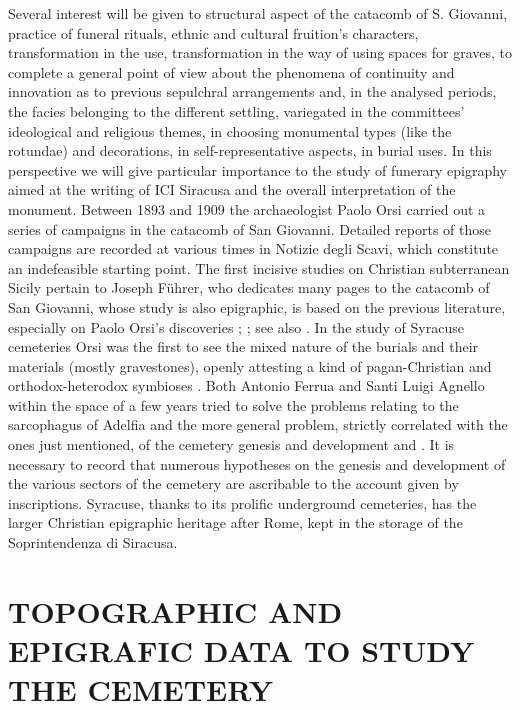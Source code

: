 \documentclass[amsthm,ebook]{saparticle}
\begin{document}
Several interest will be given to structural aspect of the catacomb of S. Giovanni, practice of funeral rituals, ethnic and cultural fruition’s characters, transformation in the use, transformation in the way of using spaces for graves, to complete a general point of view about the phenomena of continuity and innovation as to previous sepulchral arrangements and, in the analysed periods, the facies belonging to the different settling, variegated in the committees’ ideological and religious themes, in choosing monumental types (like the rotundae) and decorations, in self-representative aspects, in burial uses. In this perspective we will give particular importance to the study of funerary epigraphy aimed at the writing of ICI Siracusa and the overall interpretation of the monument.
Between 1893 and 1909 the archaeologist Paolo Orsi carried out a series of campaigns in the catacomb of San Giovanni. Detailed reports of those campaigns are recorded at various times in Notizie degli Scavi, which constitute an indefeasible starting point. The first incisive studies on Christian subterranean Sicily pertain to Joseph Führer, who dedicates many pages to the catacomb of San Giovanni, whose study is also epigraphic, is based on the previous literature, especially on Paolo Orsi’s discoveries \citep[13-39]{FUHRER1897}; \citep[22-26]{FUHRERSCHULTZE1907}; see also \citep[276, n. 2]{ORSI1893} 
. In the study of Syracuse cemeteries Orsi \citep[189]{ORSI1900} was the first to see the mixed nature of the burials and their materials (mostly gravestones), openly attesting a kind of pagan-Christian and orthodox-heterodox symbioses %
. Both Antonio Ferrua and Santi Luigi Agnello within the space of a few years tried to solve the problems relating to the sarcophagus of Adelfia and the more general problem, strictly correlated with the ones just mentioned, of the cemetery genesis and development \citep{FERRUA1952} and \citep{AGNELLO1956}. It is necessary to record that numerous hypotheses on the genesis and development of the various sectors of the cemetery are ascribable to the account given by inscriptions. Syracuse, thanks to its prolific underground cemeteries, has the larger Christian epigraphic heritage after Rome, kept in the storage of the Soprintendenza di Siracusa.

\section{TOPOGRAPHIC AND EPIGRAFIC DATA TO STUDY THE CEMETERY}
\end{document}
